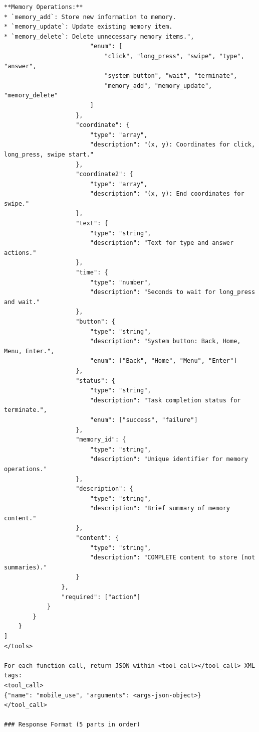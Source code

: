 \begin{tcolorbox}[
  promptstyle,
  title=\texttt{Prompt for MemGUI-Agent (system prompt).},
]
\begin{Verbatim}[fontsize=\scriptsize,breaklines,breakanywhere]
**Memory Operations:**
* `memory_add`: Store new information to memory.
* `memory_update`: Update existing memory item.
* `memory_delete`: Delete unnecessary memory items.",
                        "enum": [
                            "click", "long_press", "swipe", "type", "answer",
                            "system_button", "wait", "terminate",
                            "memory_add", "memory_update", "memory_delete"
                        ]
                    },
                    "coordinate": {
                        "type": "array",
                        "description": "(x, y): Coordinates for click, long_press, swipe start."
                    },
                    "coordinate2": {
                        "type": "array",
                        "description": "(x, y): End coordinates for swipe."
                    },
                    "text": {
                        "type": "string",
                        "description": "Text for type and answer actions."
                    },
                    "time": {
                        "type": "number",
                        "description": "Seconds to wait for long_press and wait."
                    },
                    "button": {
                        "type": "string",
                        "description": "System button: Back, Home, Menu, Enter.",
                        "enum": ["Back", "Home", "Menu", "Enter"]
                    },
                    "status": {
                        "type": "string",
                        "description": "Task completion status for terminate.",
                        "enum": ["success", "failure"]
                    },
                    "memory_id": {
                        "type": "string",
                        "description": "Unique identifier for memory operations."
                    },
                    "description": {
                        "type": "string",
                        "description": "Brief summary of memory content."
                    },
                    "content": {
                        "type": "string",
                        "description": "COMPLETE content to store (not summaries)."
                    }
                },
                "required": ["action"]
            }
        }
    }
]
</tools>

For each function call, return JSON within <tool_call></tool_call> XML tags:
<tool_call>
{"name": "mobile_use", "arguments": <args-json-object>}
</tool_call>

### Response Format (5 parts in order)


\end{Verbatim}
\end{tcolorbox}
